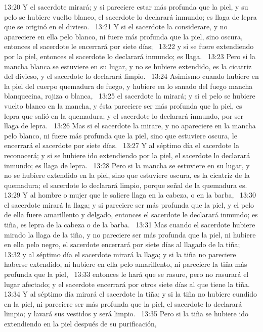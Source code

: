 13:20 Y el sacerdote mirará; y si pareciere estar más profunda que la piel, y su pelo se hubiere vuelto blanco, el sacerdote lo declarará inmundo; es llaga de lepra que se originó en el divieso.  
13:21 Y si el sacerdote la considerare, y no apareciere en ella pelo blanco, ni fuere más profunda que la piel, sino oscura, entonces el sacerdote le encerrará por siete días;  
13:22 y si se fuere extendiendo por la piel, entonces el sacerdote lo declarará inmundo; es llaga.  
13:23 Pero si la mancha blanca se estuviere en su lugar, y no se hubiere extendido, es la cicatriz del divieso, y el sacerdote lo declarará limpio.  
13:24 Asimismo cuando hubiere en la piel del cuerpo quemadura de fuego, y hubiere en lo sanado del fuego mancha blanquecina, rojiza o blanca,  
13:25 el sacerdote la mirará; y si el pelo se hubiere vuelto blanco en la mancha, y ésta pareciere ser más profunda que la piel, es lepra que salió en la quemadura; y el sacerdote lo declarará inmundo, por ser llaga de lepra.  
13:26 Mas si el sacerdote la mirare, y no apareciere en la mancha pelo blanco, ni fuere más profunda que la piel, sino que estuviere oscura, le encerrará el sacerdote por siete días.  
13:27 Y al séptimo día el sacerdote la reconocerá; y si se hubiere ido extendiendo por la piel, el sacerdote lo declarará inmundo; es llaga de lepra.  
13:28 Pero si la mancha se estuviere en su lugar, y no se hubiere extendido en la piel, sino que estuviere oscura, es la cicatriz de la quemadura; el sacerdote lo declarará limpio, porque señal de la quemadura es.  
13:29 Y al hombre o mujer que le saliere llaga en la cabeza, o en la barba,  
13:30 el sacerdote mirará la llaga; y si pareciere ser más profunda que la piel, y el pelo de ella fuere amarillento y delgado, entonces el sacerdote le declarará inmundo; es tiña, es lepra de la cabeza o de la barba.  
13:31 Mas cuando el sacerdote hubiere mirado la llaga de la tiña, y no pareciere ser más profunda que la piel, ni hubiere en ella pelo negro, el sacerdote encerrará por siete días al llagado de la tiña;  
13:32 y al séptimo día el sacerdote mirará la llaga; y si la tiña no pareciere haberse extendido, ni hubiere en ella pelo amarillento, ni pareciere la tiña más profunda que la piel,  
13:33 entonces le hará que se rasure, pero no rasurará el lugar afectado; y el sacerdote encerrará por otros siete días al que tiene la tiña.  
13:34 Y al séptimo día mirará el sacerdote la tiña; y si la tiña no hubiere cundido en la piel, ni pareciere ser más profunda que la piel, el sacerdote lo declarará limpio; y lavará sus vestidos y será limpio.  
13:35 Pero si la tiña se hubiere ido extendiendo en la piel después de su purificación,  
